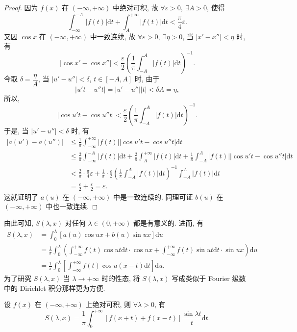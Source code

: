 \begin{proof}
因为 $f(x)$ 在 $(-\infty,+\infty)$ 中绝对可积, 故 $\forall\varepsilon>0,\ \exists A>0$, 使得
\[
  \int_{-\infty}^{-A}|f(t)|\mathrm{d}t+\int_{A}^{+\infty}|f(t)|\mathrm{d}t<\frac{\pi}{4}\varepsilon.
\]
又因 $\cos x$ 在 $(-\infty,+\infty)$ 中一致连续, 故 $\forall\varepsilon>0,\ \exists\eta>0$, 当 $|x'-x''|<\eta$ 时, 有
\[
  \left|\cos x'-\cos x''\right|<\frac{\varepsilon}{2}\left(\frac{1}{\pi}\int_{-A}^{A}|f(t)|\mathrm{d}t\right)^{-1}.
\]
今取 $\delta=\dfrac{\eta}{A}$, 当 $|u'-u''|<\delta$, $t\in[-A,A]$ 时, 由于
\[
  |u't-u''t|=|u'-u''||t|<\delta A=\eta,
\]
所以,
\[
  |\cos u't-\cos u''t|<\frac{\varepsilon}{2}\left(\frac{1}{\pi}\int_{-A}^{A}|f(t)|\mathrm{d}t\right)^{-1}.
\]
于是, 当 $|u'-u''|<\delta$ 时, 有
\begin{align*}
  |a(u')-a(u'')|&\leqslant\frac{1}{\pi}\int_{-\infty}^{+\infty}|f(t)||\cos u't-\cos u''t|\mathrm{d}t\\
  &\leqslant\frac{2}{\pi}\int_{-\infty}^{-A}|f(t)|\mathrm{d}t+\frac{2}{\pi}\int_{A}^{+\infty}|f(t)|\mathrm{d}t+\frac{1}{\pi}\int_{-A}^{A}|f(t)||\cos u't-\cos u''t|\mathrm{d}t\\
  &<\frac{2}{\pi}\cdot\frac{\pi}{4}\varepsilon+\frac{1}{\pi}\cdot\frac{\varepsilon}{2}\left(\frac{1}{\pi}\int_{-A}^{A}|f(t)|\mathrm{d}t\right)^{-1}\int_{-A}^{A}|f(t)|\mathrm{d}t\\
  &=\frac{\varepsilon}{2}+\frac{\varepsilon}{2}=\varepsilon.
\end{align*}
这就证明了 $a(u)$ 在 $(-\infty,+\infty)$ 中是一致连续的. 同理可证 $b(u)$ 在 $(-\infty,+\infty)$ 中也一致连续.
\end{proof}

由此可知, $S(\lambda,x)$ 对任何 $\lambda\in(0,+\infty)$ 都是有意义的. 进而, 有
\begin{align*}
  S(\lambda,x)&=\int_{0}^{\lambda}[a(u)\cos ux+b(u)\sin ux]\mathrm{d}u\\
  &=\frac{1}{\pi}\int_{0}^{\lambda}\left(\int_{-\infty}^{+\infty}f(t)\cos ut\mathrm{d}t\cdot\cos ux+\int_{-\infty}^{+\infty}f(t)\sin ut\mathrm{d}t\cdot\sin ux\right)\mathrm{d}u\\
  &=\frac{1}{\pi}\int_{0}^{\lambda}\left[\int_{-\infty}^{+\infty}f(t)\cos u(x-t)\mathrm{d}t\right]\mathrm{d}u.
\end{align*}
为了研究 $S(\lambda,x)$ 当 $\lambda\to+\infty$ 时的性态, 将 $S(\lambda,x)$ 写成类似于 Fourier 级数中的 Dirichlet 积分那样更为方便.

\begin{theorem}\label{thm:16.3.2}
设 $f(x)$ 在 $(-\infty,+\infty)$ 上绝对可积, 则 $\forall\lambda>0$, 有
\[
  S(\lambda,x)=\frac{1}{\pi}\int_{0}^{+\infty}\left[f(x+t)+f(x-t)\right]\frac{\sin\lambda t}{t}\mathrm{d}t.
\]
\end{theorem}

